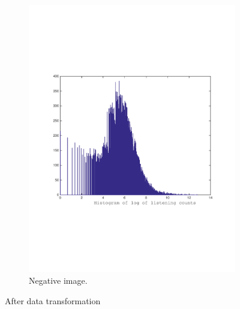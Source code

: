 \begin{figure}[h]
\begin{subfigure}[b]{0.45\textwidth}
    \includegraphics[width=\textwidth]{figures/histLogYtrain_crop.pdf}
    \caption{Negative image.}
  \end{subfigure}
  \caption{After data transformation}
  \label{fig:count_distribution}
\end{figure}

